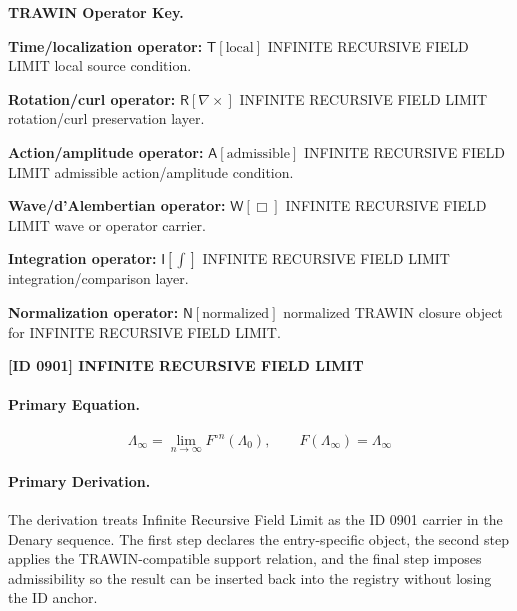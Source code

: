 \par\vspace{0.45\baselineskip}
\noindent\begin{minipage}[t]{\linewidth}
\begingroup
\small
\raggedright
\textbf{TRAWIN Operator Key.}\par
\noindent\textbf{Time/localization operator:} $\mathsf{T}\!\left[\mathrm{local}\right]$ INFINITE RECURSIVE FIELD LIMIT local source condition.\par
\noindent\textbf{Rotation/curl operator:} $\mathsf{R}\!\left[\nabla\times\right]$ INFINITE RECURSIVE FIELD LIMIT rotation/curl preservation layer.\par
\noindent\textbf{Action/amplitude operator:} $\mathsf{A}\!\left[\mathrm{admissible}\right]$ INFINITE RECURSIVE FIELD LIMIT admissible action/amplitude condition.\par
\noindent\textbf{Wave/d'Alembertian operator:} $\mathsf{W}\!\left[\Box\right]$ INFINITE RECURSIVE FIELD LIMIT wave or operator carrier.\par
\noindent\textbf{Integration operator:} $\mathsf{I}\!\left[\int\right]$ INFINITE RECURSIVE FIELD LIMIT integration/comparison layer.\par
\noindent\textbf{Normalization operator:} $\mathsf{N}\!\left[\mathrm{normalized}\right]$ normalized TRAWIN closure object for INFINITE RECURSIVE FIELD LIMIT.\par
\endgroup
\end{minipage}

\clearpage
\noindent\textbf{[ID 0901] INFINITE RECURSIVE FIELD LIMIT}\par
\vspace{0.35em}
\paragraph{Primary Equation.}
\[
\Lambda_{\infty}=\lim_{n\to\infty}F^{\circ n}(\Lambda_0),\qquad F(\Lambda_{\infty})=\Lambda_{\infty}
\]

\paragraph{Primary Derivation.}
The derivation treats Infinite Recursive Field Limit as the ID 0901 carrier in the Denary sequence. The first step declares the entry-specific object, the second step applies the TRAWIN-compatible support relation, and the final step imposes admissibility so the result can be inserted back into the registry without losing the ID anchor.

